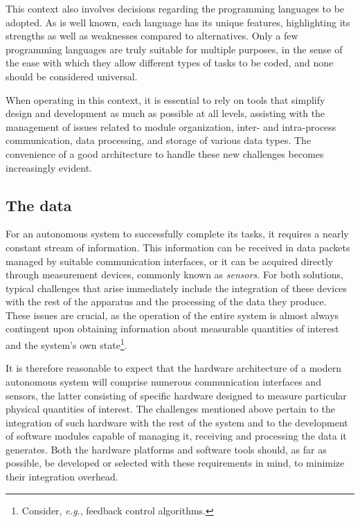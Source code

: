 This context also involves decisions regarding the programming languages to be adopted. As is well known, each language has its unique features, highlighting its strengths as well as weaknesses compared to alternatives. Only a few programming languages are truly suitable for multiple purposes, in the sense of the ease with which they allow different types of tasks to be coded, and none should be considered universal.

When operating in this context, it is essential to rely on tools that simplify design and development as much as possible at all levels, assisting with the management of issues related to module organization, inter- and intra-process communication, data processing, and storage of various data types. The convenience of a good architecture to handle these new challenges becomes increasingly evident.

\subsection{The data}
\label{sec:design_challenges_data}
For an autonomous system to successfully complete its tasks, it requires a nearly constant stream of information. This information can be received in data packets managed by suitable communication interfaces, or it can be acquired directly through measurement devices, commonly known as \emph{sensors}. For both solutions, typical challenges that arise immediately include the integration of these devices with the rest of the apparatus and the processing of the data they produce. These issues are crucial, as the operation of the entire system is almost always contingent upon obtaining information about measurable quantities of interest and the system's own state\footnote{Consider, \emph{e.g.}, feedback control algorithms.}.

It is therefore reasonable to expect that the hardware architecture of a modern autonomous system will comprise numerous communication interfaces and sensors, the latter consisting of specific hardware designed to measure particular physical quantities of interest. The challenges mentioned above pertain to the integration of such hardware with the rest of the system and to the development of software modules capable of managing it, receiving and processing the data it generates. Both the hardware platforms and software tools should, as far as possible, be developed or selected with these requirements in mind, to minimize their integration overhead.

